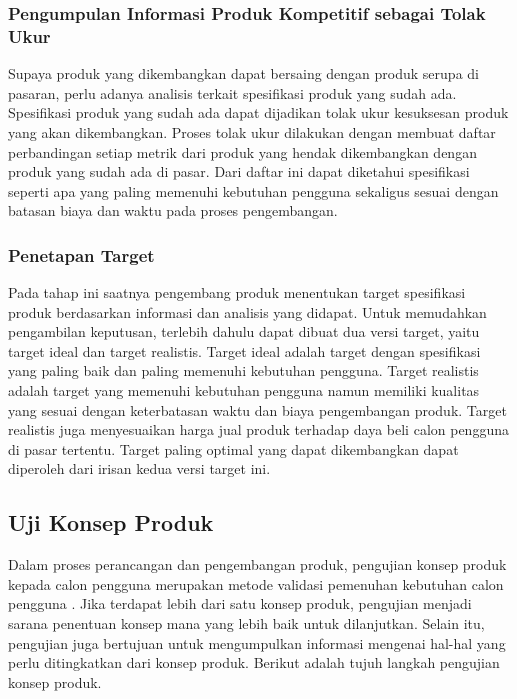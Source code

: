 \subsubsection{Pengumpulan Informasi Produk Kompetitif sebagai Tolak Ukur}
Supaya produk yang dikembangkan dapat bersaing dengan produk serupa di pasaran, perlu adanya analisis terkait spesifikasi produk yang sudah ada. Spesifikasi produk yang sudah ada dapat dijadikan tolak ukur kesuksesan produk yang akan dikembangkan. Proses tolak ukur dilakukan dengan membuat daftar perbandingan setiap metrik dari produk yang hendak dikembangkan dengan produk yang sudah ada di pasar. Dari daftar ini dapat diketahui spesifikasi seperti apa yang paling memenuhi kebutuhan pengguna sekaligus sesuai dengan batasan biaya dan waktu pada proses pengembangan. \par 
\subsubsection{Penetapan Target}
Pada tahap ini saatnya pengembang produk menentukan target spesifikasi produk berdasarkan informasi dan analisis yang didapat. Untuk memudahkan pengambilan keputusan, terlebih dahulu dapat dibuat dua versi target, yaitu target ideal dan target realistis. Target ideal adalah target dengan spesifikasi yang paling baik dan paling memenuhi kebutuhan pengguna. Target realistis adalah target yang memenuhi kebutuhan pengguna namun memiliki kualitas yang sesuai dengan keterbatasan waktu dan biaya pengembangan produk. Target realistis juga menyesuaikan harga jual produk terhadap daya beli calon pengguna di pasar tertentu. Target paling optimal yang dapat dikembangkan dapat diperoleh dari irisan kedua versi target ini. \par 



\subsection{Uji Konsep Produk}
Dalam proses perancangan dan pengembangan produk, pengujian konsep produk kepada calon pengguna merupakan metode validasi pemenuhan kebutuhan calon pengguna \cite{bukuUlrich}. Jika terdapat lebih dari satu konsep produk, pengujian menjadi sarana penentuan konsep mana yang lebih baik untuk dilanjutkan. Selain itu, pengujian juga bertujuan untuk mengumpulkan informasi mengenai hal-hal yang perlu ditingkatkan dari konsep produk. Berikut adalah tujuh langkah pengujian konsep produk. \par 
